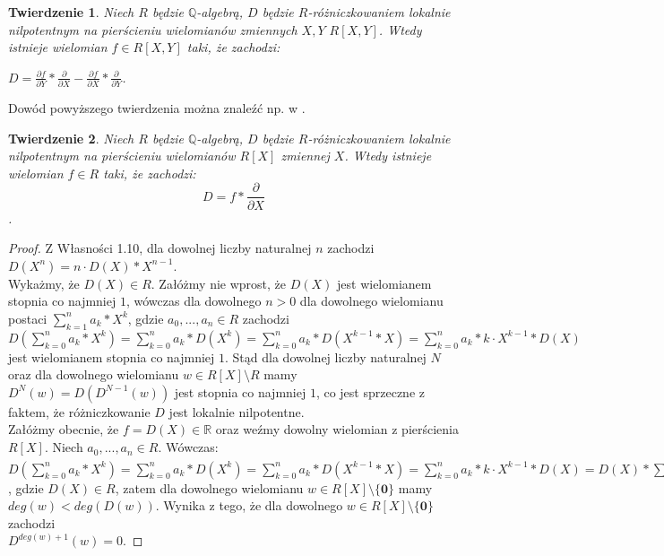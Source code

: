 \documentclass[12pt,a4paper]{article}
\newtheorem{twr}{Twierdzenie}[section]
\numberwithin{equation}{section}
\begin{document}
\begin{twr}
Niech $R$ będzie $\mathbb{Q}$-algebrą, $D$ będzie $R$-różniczkowaniem lokalnie nilpotentnym na pierścieniu wielomianów zmiennych $X,Y$ $R[X,Y]$. Wtedy istnieje wielomian $f\in R[X,Y]$ taki, że zachodzi: 
\begin{flushleft}
$D=\frac{\partial f}{\partial Y}* \frac{\partial}{\partial X}-\frac{\partial f}{\partial X}* \frac{\partial}{\partial Y}$.
\end{flushleft}
\end{twr}
Dowód powyższego twierdzenia można znaleźć np. w \cite{pvr}.

\begin{twr}
Niech $R$ będzie $\mathbb{Q}$-algebrą, $D$ będzie $R$-różniczkowaniem lokalnie nilpotentnym na pierścieniu wielomianów $R[X]$ zmiennej $X$. Wtedy istnieje wielomian $f\in R$ taki, że zachodzi: 
$$D=f*\frac{\partial}{\partial X}$$.
\end{twr}
\begin{proof}
Z Własności 1.10, dla dowolnej liczby naturalnej $n$ zachodzi
$D(X^n)=n\cdot D(X)*X^{n-1}$.
\\Wykażmy, że $D(X)\in R$. Załóżmy nie wprost, że $D(X)$ jest wielomianem stopnia co najmniej $1$, wówczas dla dowolnego $n>0$ dla dowolnego wielomianu postaci $\displaystyle \sum_{k=1}^n a_k*X^k$, gdzie $a_0,...,a_n\in R$ zachodzi
$\displaystyle D(\sum_{k=0}^n a_k*X^k)= \sum_{k=0}^n a_k*D(X^k)=\sum_{k=0}^n a_k* D(X^{k-1}*X)=\sum_{k=0}^n a_k* k\cdot X^{k-1}*D(X)$ jest wielomianem stopnia co najmniej $1$. Stąd dla dowolnej liczby naturalnej $N$ oraz dla dowolnego wielomianu $w\in R[X]\setminus R$ mamy $D^N(w)=D(D^{N-1}(w))$ jest stopnia co najmniej $1$, co jest sprzeczne z faktem, że różniczkowanie $D$ jest lokalnie nilpotentne. 
\\Załóżmy obecnie, że $f=D(X)\in \mathbb{R}$ oraz weźmy dowolny wielomian z pierścienia $R[X]$. Niech $a_0,...,a_n\in R$. Wówczas:
\\$\displaystyle D(\sum_{k=0}^n a_k*X^k)= \sum_{k=0}^n a_k*D(X^k)=\sum_{k=0}^n a_k* D(X^{k-1}*X)=\sum_{k=0}^n a_k* k\cdot X^{k-1}*D(X)
=D(X)*\sum_{k=0}^n a_k* k\cdot X^{k-1}=D(X)*\frac{\partial \sum_{k=0}^n a_k*X^k}{\partial X}$, gdzie $D(X)\in R$, zatem dla dowolnego wielomianu $w\in R[X]\setminus \{ \textbf{0} \}$ mamy $deg(w)<deg(D(w))$. Wynika z tego, że dla dowolnego $w\in R[X]\setminus \{ \textbf{0}\}$ zachodzi\\
$D^{deg(w)+1}(w)=0$.
\end{proof}
\end{document}
